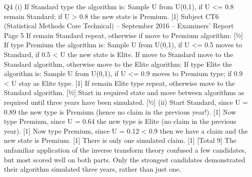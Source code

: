 \documentclass[]{report}
\begin{document}
  Q4 (i) If Standard type the algorithm is:
    Sample U from U(0,1), if U <= 0.8 remain Standard; if U > 0.8 the new state
  is Premium. [1]
  Subject CT6 (Statistical Methods Core Technical) – September 2016 – Examiners’ Report
  Page 5
  If remain Standard repeat, otherwise if move to Premium algorithm: [½]
  If type Premium the algorithm is:
    Sample U from U(0,1), if U <= 0.5 moves to Standard, if 0.5 < U the new state
  is Elite. 
  If move to Standard move to the Standard algorithm, otherwise move to the
  Elite algorithm: 
  If type Elite the algorithm is:
    Sample U from U(0,1), if U <= 0.9 moves to Premium type; if 0.9 < U stay as
  Elite type. [1]
  If remain Elite type repeat, otherwise move to the Standard algorithm. [½]
  Start in required state and move between algorithms as required until three
  years have been simulated. [½]
  (ii) Start Standard, since U = 0.89 the new type is Premium (hence no claim in the
                                                               previous year!). [1]
  Now type Premium, since U = 0.64 the new type is Elite (no claim in the
                                                          previous year). [1]
  Now type Premium, since U = 0.12 < 0.9 then we have a claim and the new
  state is Premium. [1]
  There is only one simulated claim. [1]
  [Total 9]
  The unfamiliar application of the inverse transform theory confused a few
  candidates, but most scored well on both parts. Only the strongest
  candidates demonstrated their algorithm simulated three years, rather than
  just one.
  
\end{document}
